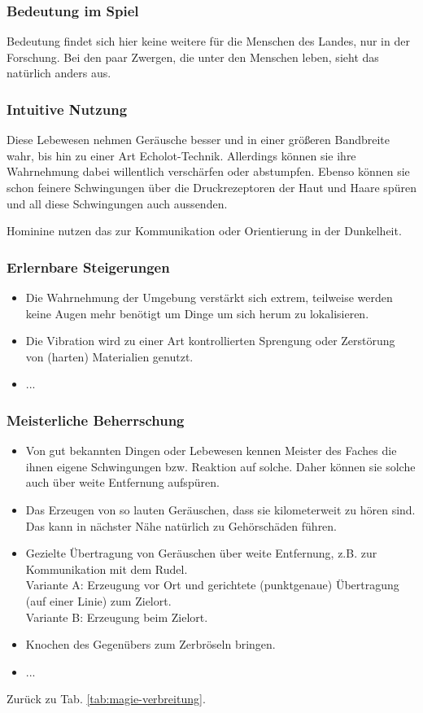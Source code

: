 \subsubsection{Bedeutung im Spiel}
Bedeutung findet sich hier keine weitere für die Menschen des Landes, nur in der Forschung. Bei den paar Zwergen, die unter den Menschen leben, sieht das natürlich anders aus.

\subsubsection{Intuitive Nutzung}
Diese Lebewesen nehmen Geräusche besser und in einer größeren Bandbreite wahr, bis hin zu einer Art Echolot-Technik. Allerdings können sie ihre Wahrnehmung dabei willentlich verschärfen oder abstumpfen. Ebenso können sie schon feinere Schwingungen über die Druckrezeptoren der Haut und Haare spüren und all diese Schwingungen auch aussenden.

Hominine nutzen das zur Kommunikation oder Orientierung in der Dunkelheit. 

\subsubsection{Erlernbare Steigerungen}
\begin{itemize}
	\item Die Wahrnehmung der Umgebung verstärkt sich extrem, teilweise werden keine Augen mehr benötigt um Dinge um sich herum zu lokalisieren. 
	\item Die Vibration wird zu einer Art kontrollierten Sprengung oder Zerstörung von (harten) Materialien genutzt.
	\item ...
\end{itemize}

\subsubsection{Meisterliche Beherrschung} 
\begin{itemize}
	\item Von gut bekannten Dingen oder Lebewesen kennen Meister des Faches die ihnen eigene Schwingungen bzw. Reaktion auf solche. Daher können sie solche auch über weite Entfernung aufspüren.
	\item Das Erzeugen von so lauten Geräuschen, dass sie kilometerweit zu hören sind. Das kann in nächster Nähe natürlich zu Gehörschäden führen.
	\item Gezielte Übertragung von Geräuschen über weite Entfernung, z.B. zur Kommunikation mit dem Rudel. \\ 
	Variante A: Erzeugung vor Ort und gerichtete (punktgenaue) Übertragung (auf einer Linie) zum Zielort. \\
	Variante B: Erzeugung beim Zielort.
	\item Knochen des Gegenübers zum Zerbröseln bringen.
	\item ...
\end{itemize}
Zurück zu Tab. \ref{tab:magie-verbreitung}.



